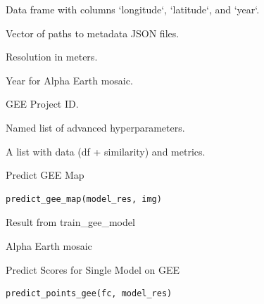 \documentclass[letterpaper]{book}
\begin{document}
%
\begin{Arguments}
\begin{ldescription}
\item[\code{df}] Data frame with columns `longitude`, `latitude`, and `year`.

\item[\code{analysis\_meta\_paths}] Vector of paths to metadata JSON files.

\item[\code{scale}] Resolution in meters.

\item[\code{aoi\_year}] Year for Alpha Earth mosaic.

\item[\code{gee\_project}] GEE Project ID.

\item[\code{options}] Named list of advanced hyperparameters.
\end{ldescription}
\end{Arguments}
%
\begin{Value}
A list with data (df + similarity) and metrics.
\end{Value}
%
\begin{Description}
Predict GEE Map
\end{Description}
%
\begin{Usage}
\begin{verbatim}
predict_gee_map(model_res, img)
\end{verbatim}
\end{Usage}
%
\begin{Arguments}
\begin{ldescription}
\item[\code{model\_res}] Result from train\_gee\_model

\item[\code{img}] Alpha Earth mosaic
\end{ldescription}
\end{Arguments}
%
\begin{Description}
Predict Scores for Single Model on GEE
\end{Description}
%
\begin{Usage}
\begin{verbatim}
predict_points_gee(fc, model_res)
\end{verbatim}
\end{Usage}
\end{document}
